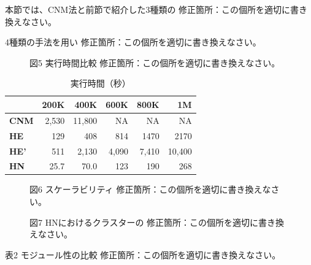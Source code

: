 \documentclass [a4j,11pt] {jsarticle}
\begin{document}
\begin {空欄ブロック}{本節では、CNM法と前節で紹介した3種類の}
修正箇所：この個所を適切に書き換えなさい。
\end {空欄ブロック}

\begin {空欄ブロック}{4種類の手法を用い}
修正箇所：この個所を適切に書き換えなさい。
\end {空欄ブロック}

\begin{figure}[htbp]
\begin {空欄ブロック}{図5 実行時間比較}
修正箇所：この個所を適切に書き換えなさい。
\end {空欄ブロック}
\end{figure}

\begin {table}
  \caption {実行時間（秒）}
  \label {tbl: elapsed time}
  \begin {center}
    \begin {tabular}{lrrrrr} \\ \hline
          & 200K & 400K & 600K & 800K & 1M \\ \hline
      \textbf {CNM}& 2,530 & 11,800 & NA & NA & NA \\
      \textbf {HE}  & 129  & 408  & 814  & 1470 & 2170 \\
      \textbf {HE'} & 511  & 2,130 & 4,090 & 7,410 & 10,400 \\
      \textbf {HN}  & 25.7 & 70.0 & 123  & 190  & 268 \\
      \hline
    \end {tabular}
  \end {center}
\end {table}

\begin{figure}[htbp]
\begin {空欄ブロック}{図6 スケーラビリティ}
修正箇所：この個所を適切に書き換えなさい。
\end {空欄ブロック}
\end{figure}

\begin{figure}[htbp]
\begin {空欄ブロック}{図7 HNにおけるクラスターの}
修正箇所：この個所を適切に書き換えなさい。
\end {空欄ブロック}
\end{figure}

\begin {table}
\begin {空欄ブロック}{表2 モジュール性の比較}
修正箇所：この個所を適切に書き換えなさい。
\end {空欄ブロック}
\end {table}
\end{document}
